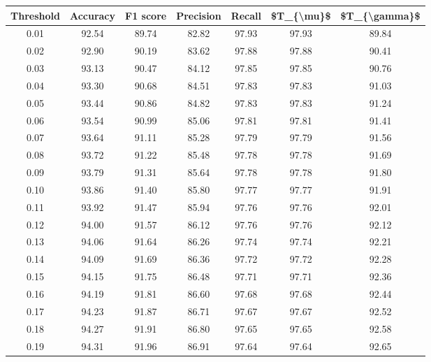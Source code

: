 \begin{tabular}{|c|c|c|c|c|c|c|}
\hline
 Threshold &  Accuracy &  F1 score &  Precision &  Recall &  \$T\_\{\textbackslash mu\}\$ &  \$T\_\{\textbackslash gamma\}\$ \\
\hline
      0.01 &     92.54 &     89.74 &      82.82 &   97.93 &      97.93 &         89.84 \\
      0.02 &     92.90 &     90.19 &      83.62 &   97.88 &      97.88 &         90.41 \\
      0.03 &     93.13 &     90.47 &      84.12 &   97.85 &      97.85 &         90.76 \\
      0.04 &     93.30 &     90.68 &      84.51 &   97.83 &      97.83 &         91.03 \\
      0.05 &     93.44 &     90.86 &      84.82 &   97.83 &      97.83 &         91.24 \\
      0.06 &     93.54 &     90.99 &      85.06 &   97.81 &      97.81 &         91.41 \\
      0.07 &     93.64 &     91.11 &      85.28 &   97.79 &      97.79 &         91.56 \\
      0.08 &     93.72 &     91.22 &      85.48 &   97.78 &      97.78 &         91.69 \\
      0.09 &     93.79 &     91.31 &      85.64 &   97.78 &      97.78 &         91.80 \\
      0.10 &     93.86 &     91.40 &      85.80 &   97.77 &      97.77 &         91.91 \\
      0.11 &     93.92 &     91.47 &      85.94 &   97.76 &      97.76 &         92.01 \\
      0.12 &     94.00 &     91.57 &      86.12 &   97.76 &      97.76 &         92.12 \\
      0.13 &     94.06 &     91.64 &      86.26 &   97.74 &      97.74 &         92.21 \\
      0.14 &     94.09 &     91.69 &      86.36 &   97.72 &      97.72 &         92.28 \\
      0.15 &     94.15 &     91.75 &      86.48 &   97.71 &      97.71 &         92.36 \\
      0.16 &     94.19 &     91.81 &      86.60 &   97.68 &      97.68 &         92.44 \\
      0.17 &     94.23 &     91.87 &      86.71 &   97.67 &      97.67 &         92.52 \\
      0.18 &     94.27 &     91.91 &      86.80 &   97.65 &      97.65 &         92.58 \\
      0.19 &     94.31 &     91.96 &      86.91 &   97.64 &      97.64 &         92.65 \\

\end{tabular}
